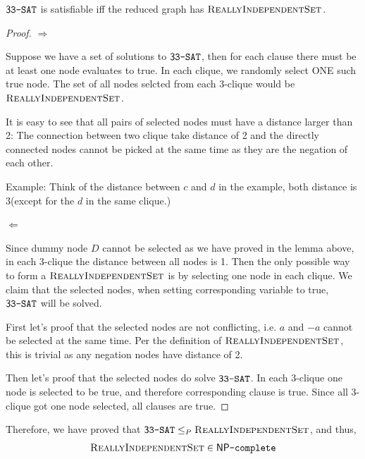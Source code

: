 \begin{theorem}
    $\mathsf{3}\texttt{3-SAT}$ is satisfiable iff the reduced graph has $\textsc{ReallyIndependentSet}$.
\end{theorem}

\begin{proof}
    $\Rightarrow$
    
    Suppose we have a set of solutions to $\mathsf{3}\texttt{3-SAT}$, then for each clause there must be at least one node evaluates to true.
    In each clique, we randomly select ONE such true node. The set of all nodes selcted from each 3-clique would be $\textsc{ReallyIndependentSet}$.

    It is easy to see that all pairs of selected nodes must have a distance larger than 2: The connection between two clique take distance of 2 and the directly connected nodes cannot be picked at the same time as they are the negation of each other.

    Example: Think of the distance between $c$ and $d$ in the example, both distance is 3(except for the $d$ in the same clique.)

    $\Leftarrow$

    Since dummy node $D$ cannot be selected as we have proved in the lemma above, in each 3-clique the distance between all nodes is 1. 
    Then the only possible way to form a $\textsc{ReallyIndependentSet}$ is by selecting one node in each clique.
    We claim that the selected nodes, when setting corresponding variable to true, $\mathsf{3}\texttt{3-SAT}$ will be solved.

    First let's proof that the selected nodes are not conflicting, i.e. $a$ and $-a$ cannot be selected at the same time.
    Per the definition of $\textsc{ReallyIndependentSet}$, this is trivial as any negation nodes have distance of 2.

    Then let's proof that the selected nodes do solve $\mathsf{3}\texttt{3-SAT}$.
    In each 3-clique one node is selected to be true, and therefore corresponding clause is true. 
    Since all 3-clique got one node selected, all clauses are true.
\end{proof}

Therefore, we have proved  that $\mathsf{3}\texttt{3-SAT} \le_P \textsc{ReallyIndependentSet}$, and thus, $$\textsc{ReallyIndependentSet} \in \mathsf{NP}\texttt{-complete}$$



